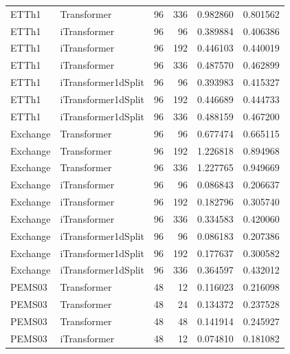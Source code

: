 \documentclass[stu,12pt,floatsintext]{apa7}
\begin{document}
\begin{longtable}{llrrrr}
       ETTh1 &         Transformer &            96 &            336 & 0.982860 & 0.801562 \\
       ETTh1 &        iTransformer &            96 &             96 & 0.389884 & 0.406386 \\
       ETTh1 &        iTransformer &            96 &            192 & 0.446103 & 0.440019 \\
       ETTh1 &        iTransformer &            96 &            336 & 0.487570 & 0.462899 \\
       ETTh1 & iTransformer1dSplit &            96 &             96 & 0.393983 & 0.415327 \\
       ETTh1 & iTransformer1dSplit &            96 &            192 & 0.446689 & 0.444733 \\
       ETTh1 & iTransformer1dSplit &            96 &            336 & 0.488159 & 0.467200 \\
    Exchange &         Transformer &            96 &             96 & 0.677474 & 0.665115 \\
    Exchange &         Transformer &            96 &            192 & 1.226818 & 0.894968 \\
    Exchange &         Transformer &            96 &            336 & 1.227765 & 0.949669 \\
    Exchange &        iTransformer &            96 &             96 & 0.086843 & 0.206637 \\
    Exchange &        iTransformer &            96 &            192 & 0.182796 & 0.305740 \\
    Exchange &        iTransformer &            96 &            336 & 0.334583 & 0.420060 \\
    Exchange & iTransformer1dSplit &            96 &             96 & 0.086183 & 0.207386 \\
    Exchange & iTransformer1dSplit &            96 &            192 & 0.177637 & 0.300582 \\
    Exchange & iTransformer1dSplit &            96 &            336 & 0.364597 & 0.432012 \\
      PEMS03 &         Transformer &            48 &             12 & 0.116023 & 0.216098 \\
      PEMS03 &         Transformer &            48 &             24 & 0.134372 & 0.237528 \\
      PEMS03 &         Transformer &            48 &             48 & 0.141914 & 0.245927 \\
      PEMS03 &        iTransformer &            48 &             12 & 0.074810 & 0.181082 \\

\end{longtable}
\end{document}
